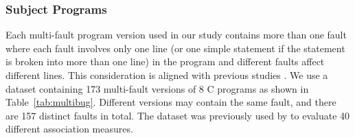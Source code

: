 %
%

\subsubsection{Subject Programs}\label{sec.exp.subject2}

Each multi-fault program version used in our study contains more than one fault where each fault involves only one line (or one simple statement if the statement is broken into more than one line) in the program and different faults affect different lines. This consideration is aligned with previous studies \citep[e.g.][]{zhang2013bridging,Abreu:2009.jss}. We use a dataset containing 173 multi-fault versions of 8 C programs as shown in Table~\ref{tab:multibug}. Different versions may contain the same fault, and there are 157 distinct faults in total. The dataset was previously used by \cite{Lucia2014} to evaluate 40 different association measures.


